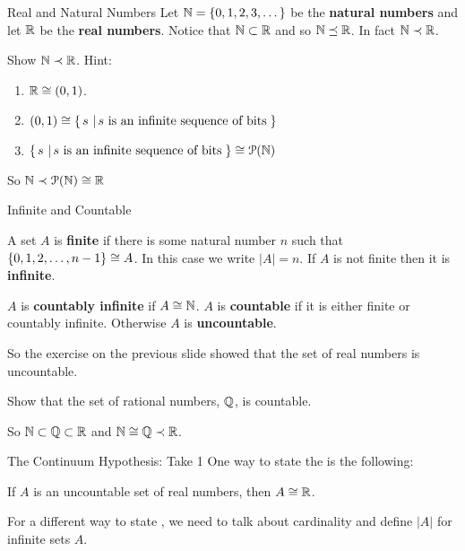 \documentclass[pdf,final]{prosper}
\newcommand{\skipsmall}{\vspace{1em}}
\newcommand{\skipmed}{\vspace{2em}}
\begin{document}
\begin{slide}{Real and Natural Numbers}
Let $\mathbb{N}=\left\{0,1,2,3,\dots\right\}$  be the \textbf{natural numbers}  and let
$\mathbb{R}$ be the \textbf{real numbers}. Notice that $\mathbb{N}\subset\mathbb{R}$ and so $\mathbb{N}\preceq
\mathbb{R}$. In fact $\mathbb{N}\prec\mathbb{R}$.

\skipsmall

\begin{exercise}
Show $\mathbb{N}\prec\mathbb{R}$.
Hint:
\begin{enumerate}
  \item $\mathbb{R}\cong (0,1)$.
  \item $(0,1) \cong \left\{ \, s \, \left| \, s\text{ is an infinite sequence of bits} \, \right.\right\}$
  \item $\left\{ \, s \, \left| \, s\text{ is an infinite sequence of bits} \, \right.\right\} \cong \operatorname{\mathcal{P}}(\mathbb{N})$
\end{enumerate}
So $\mathbb{N}\prec\operatorname{\mathcal{P}}(\mathbb{N})\cong\mathbb{R}$
\end{exercise}

\end{slide}

\begin{slide}{Infinite and Countable}

\begin{definition}
A set $A$ is \textbf{finite} if there is some natural number $n$ such that
$\left\{0,1,2,\dots,n-1\right\} \cong A$. In this case we write $|A|=n$. If $A$ is
not finite then it is \textbf{infinite}.
\end{definition}

\skipsmall

\begin{definition}
$A$ is  \textbf{countably infinite} if $A\cong\mathbb{N}$. $A$ is \textbf{countable}
if it is either finite or countably infinite. Otherwise $A$ is \textbf{uncountable}.
\end{definition}

\skipmed

So the exercise on the previous slide showed that the set of real numbers is uncountable.

\skipsmall

\begin{exercise}
Show that the set of rational numbers, $\mathbb{Q}$, is countable.
\end{exercise}

\skipsmall

So $\mathbb{N}\subset\mathbb{Q}\subset\mathbb{R}$ and $\mathbb{N}\cong\mathbb{Q}\prec\mathbb{R}$.

\end{slide}

\begin{slide}{The Continuum Hypothesis: Take 1}
One way to state the \CH is the following:
\skipmed
\begin{ch}
If $A$ is an uncountable set of real numbers, then $A\cong\mathbb{R}$.
\end{ch}

\skipsmall

For a different way to state \CH, we need to talk about cardinality and define
$|A|$ for infinite sets $A$.

\end{slide}
\end{document}
